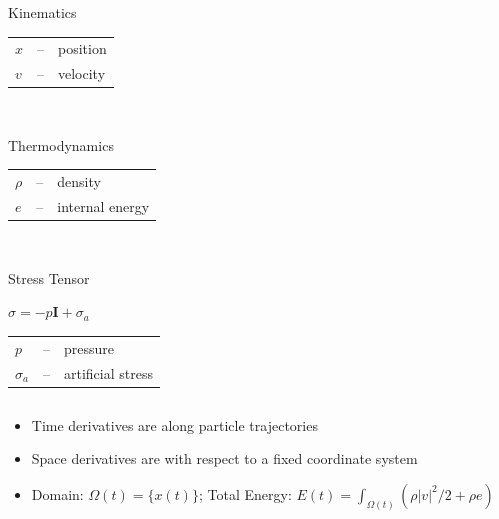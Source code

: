 \documentclass[8pt,xcolor=svgnames]{beamer}
\newcommand{\myem}[1]{{\textcolor{myorange}{#1}}}
\begin{document}
\begin{frame}
\begin{columns}
\begin{column}{0.35\textwidth}
\begin{center}
\begin{minipage}{0.7\textwidth}
\begin{block}{\small Kinematics}
\begin{tabular}{lcl}
$x$ & -- & position \\
$v$ & -- & velocity \\
\end{tabular}
\end{block}
\end{minipage}\\
\begin{minipage}{0.9\textwidth}
\begin{block}{\small Thermodynamics}
\begin{tabular}{lcl}
$\rho$ & -- & density \\
$e$ & -- & internal energy \\
\end{tabular}
\end{block}
\end{minipage}\\
\begin{minipage}{1.0\textwidth}
\begin{block}{\small Stress Tensor}
\begin{center}
$\sigma = -p \mathbf{I} + \sigma_{a} $
\end{center}
\begin{tabular}{lcl}
$p$ & -- & pressure \\
$\sigma_{a}$ & -- & artificial stress \\
\end{tabular}
\end{block}
\end{minipage}
\end{center}
\end{column}
\end{columns}

\bigskip

\begin{itemize}
\item Time derivatives are along particle trajectories
\item Space derivatives are with respect to a fixed coordinate system
\item \myem{Domain}: $\Omega(t)=\{x(t)\}$;
      \myem{Total Energy}: $E(t)=\int_{\Omega(t)} (\rho |v|^2/2 + \rho e)$
\end{itemize}
\end{frame}

\end{document}
